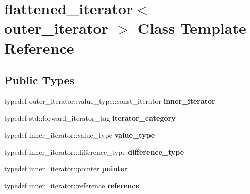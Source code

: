 \hypertarget{classflattened__iterator}{}\section{flattened\+\_\+iterator$<$ outer\+\_\+iterator $>$ Class Template Reference}
\label{classflattened__iterator}
\subsection*{Public Types}
\begin{DoxyCompactItemize}
\item 
\mbox{\label{classflattened__iterator_a3803fc6fa975d0e8dd66a8d669cb0064}} 
typedef outer\+\_\+iterator\+::value\+\_\+type\+::const\+\_\+iterator {\bfseries inner\+\_\+iterator}
\item 
\mbox{\label{classflattened__iterator_a28e7bcc458ae1d05643f9a7bd1ebfbcd}} 
typedef std\+::forward\+\_\+iterator\+\_\+tag {\bfseries iterator\+\_\+category}
\item 
\mbox{\label{classflattened__iterator_af1e8b0096cace723c2d0b60470d5925c}} 
typedef inner\+\_\+iterator\+::value\+\_\+type {\bfseries value\+\_\+type}
\item 
\mbox{\label{classflattened__iterator_a4ab2d639b584da5c42f3d590c6b90faa}} 
typedef inner\+\_\+iterator\+::difference\+\_\+type {\bfseries difference\+\_\+type}
\item 
\mbox{\label{classflattened__iterator_aa3d53a90ae07beb6cc65ee92a08f0a92}} 
typedef inner\+\_\+iterator\+::pointer {\bfseries pointer}
\item 
\mbox{\label{classflattened__iterator_af1263a0f7e3983a55a7b42369885a538}} 
typedef inner\+\_\+iterator\+::reference {\bfseries reference}
\end{DoxyCompactItemize}
